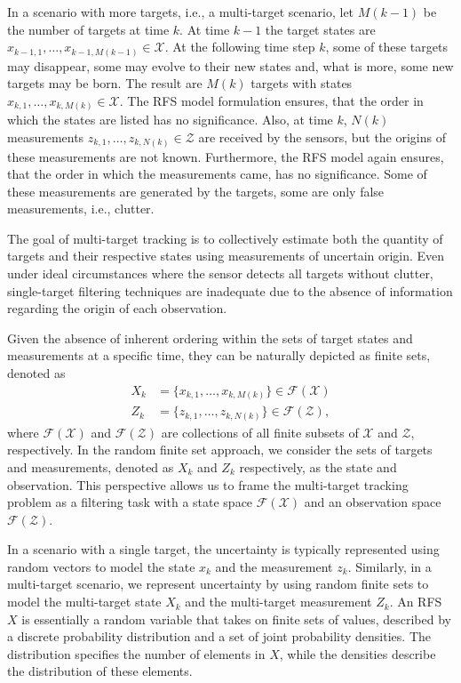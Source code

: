 In a scenario with more targets, i.e., a multi-target scenario, let $M(k-1)$ be the number of targets at time $k$. At time $k-1$ the target states are $x_{k-1,1}, \dots, x_{k-1,M(k-1)} \in \mathcal{X}$. At the following time step $k$, some of these targets may disappear, some may evolve to their new states and, what is more, some new targets may be born. The result are $M(k)$ targets with states $x_{k,1},\dots, x_{k,M(k)} \in \mathcal{X}$. The RFS model formulation ensures, that the order in which the states are listed has no significance. Also, at time $k$, $N(k)$ measurements $z_{k,1},\dots,z_{k,N(k)} \in \mathcal{Z}$ are received by the sensors, but the origins of these measurements are not known. Furthermore, the RFS model again ensures, that the order in which the measurements came, has no significance. Some of these measurements are generated by the targets, some are only false measurements, i.e., clutter.

The goal of multi-target tracking is to collectively estimate both the quantity of targets and their respective states using measurements of uncertain origin. Even under ideal circumstances where the sensor detects all targets without clutter, single-target filtering techniques are inadequate due to the absence of information regarding the origin of each observation.

Given the absence of inherent ordering within the sets of target states and measurements at a specific time, they can be naturally depicted as finite sets, denoted as
\begin{align}
    X_k &= \{x_{k,1},\dots, x_{k,M(k)}\} \in \mathcal{F}(\mathcal{X}) \\
    Z_k &= \{z_{k,1},\dots, z_{k,N(k)}\} \in \mathcal{F}(\mathcal{Z}),
\end{align}
where $\mathcal{F}(\mathcal{X})$ and $\mathcal{F}(\mathcal{Z})$ are collections of all finite subsets of $\mathcal{X}$ and $\mathcal{Z}$, respectively. In the random finite set approach, we consider the sets of targets and measurements, denoted as $X_k$ and $Z_k$ respectively, as the state and observation. This perspective allows us to frame the multi-target tracking problem as a filtering task with a state space $\mathcal{F}(\mathcal{X})$ and an observation space $\mathcal{F}(\mathcal{Z})$.

In a scenario with a single target, the uncertainty is typically represented using random vectors to model the state $x_k$ and the measurement $z_k$. Similarly, in a multi-target scenario, we represent uncertainty by using random finite sets to model the multi-target state $X_k$ and the multi-target measurement $Z_k$. An RFS $X$ is essentially a random variable that takes on finite sets of values, described by a discrete probability distribution and a set of joint probability densities. The distribution specifies the number of elements in $X$, while the densities describe the distribution of these elements.

